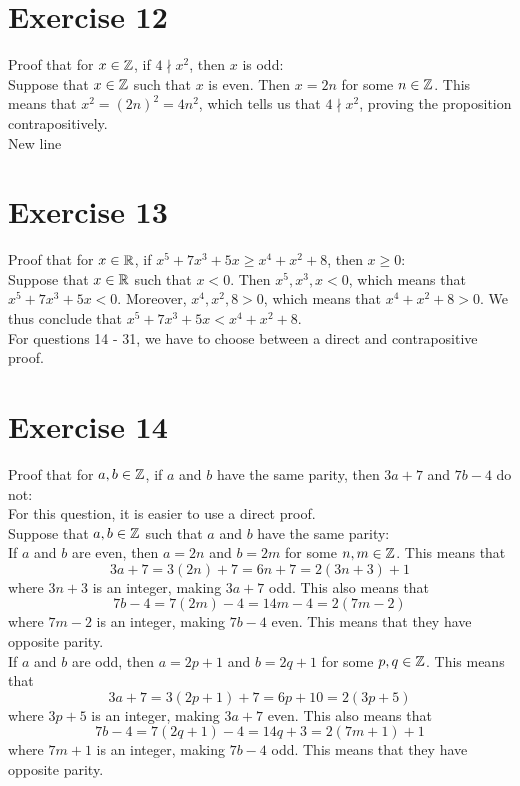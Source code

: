 \documentclass[12pt]{article}
\begin{document}
    \section*{Exercise 12}
    Proof that for $x \in \mathbb{Z}$,
    if $4 \nmid x^2$,
    then $x$ is odd: \\
    Suppose that $x \in \mathbb{Z}$
    such that $x$ is even.
    Then $x = 2n$ for some $n \in \mathbb{Z}$.
    This means that $x^2 = (2n)^2 = 4n^2$,
    which tells us that $4 \nmid x^2$,
    proving the proposition contrapositively. \\
New line

    \section*{Exercise 13}
    Proof that for $x \in \mathbb{R}$,
    if $x^5 + 7x^3 + 5x \geqslant x^4 + x^2 + 8$,
    then $x \geqslant 0$: \\
    Suppose that $x \in \mathbb{R}$
    such that $x < 0$.
    Then $x^5, x^3, x < 0$,
    which means that $x^5 + 7x^3 + 5x < 0$.
    Moreover,
    $x^4, x^2, 8 > 0$,
    which means that $x^4 + x^2 + 8 > 0$.
    We thus conclude that $x^5 + 7x^3 + 5x < x^4 + x^2 + 8$. \\

    For questions 14 - 31, we have to choose between a direct
    and contrapositive proof. \\

    \section*{Exercise 14}
    Proof that for $a, b \in \mathbb{Z}$,
    if $a$ and $b$ have the same parity,
    then $3a + 7$ and $7b - 4$ do not: \\
    For this question, it is easier to use a direct proof. \\
    Suppose that $a, b \in \mathbb{Z}$
    such that $a$ and $b$ have the same parity: \\
    If $a$ and $b$ are even,
    then $a = 2n$ and $b = 2m$ for some $n, m \in \mathbb{Z}$.
    This means that
    \[ 3a + 7 = 3(2n) + 7 = 6n + 7 = 2(3n + 3) + 1 \]
    where $3n + 3$ is an integer,
    making $3a + 7$ odd.
    This also means that
    \[ 7b - 4 = 7(2m) - 4 = 14m - 4 = 2(7m - 2) \]
    where $7m - 2$ is an integer,
    making $7b - 4$ even.
    This means that they have opposite parity. \\
    If $a$ and $b$ are odd,
    then $a = 2p + 1$ and $b = 2q + 1$ for some $p, q \in \mathbb{Z}$.
    This means that
    \[ 3a + 7 = 3(2p + 1) + 7 = 6p + 10 = 2(3p + 5) \]
    where $3p + 5$ is an integer,
    making $3a + 7$ even.
    This also means that
    \[ 7b - 4 = 7(2q + 1) - 4 = 14q + 3 = 2(7m + 1) + 1 \]
    where $7m + 1$ is an integer,
    making $7b - 4$ odd.
    This means that they have opposite parity. \\
\end{document}
